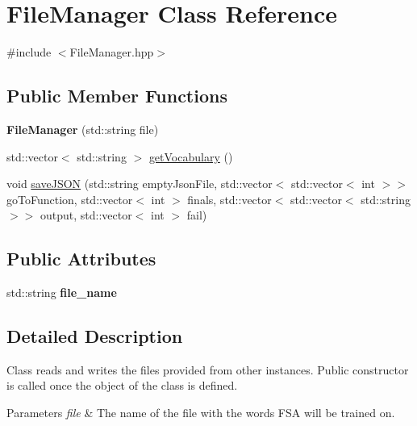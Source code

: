 \hypertarget{classFileManager}{}\section{File\+Manager Class Reference}
\label{classFileManager}


{\ttfamily \#include $<$File\+Manager.\+hpp$>$}

\subsection*{Public Member Functions}
\begin{DoxyCompactItemize}
\item 
\mbox{\label{classFileManager_a5b55a1626f54b1b7c97b8c70d1fe843c}} 
{\bfseries File\+Manager} (std\+::string file)
\item 
std\+::vector$<$ std\+::string $>$ \hyperlink{classFileManager_ac9b807a2698e538246c349023e7b07d1}{get\+Vocabulary} ()
\item 
void \hyperlink{classFileManager_aa3fd9c8bba7be2102df0ddaefa57f65f}{save\+J\+S\+ON} (std\+::string empty\+Json\+File, std\+::vector$<$ std\+::vector$<$ int $>$$>$ go\+To\+Function, std\+::vector$<$ int $>$ finals, std\+::vector$<$ std\+::vector$<$ std\+::string $>$$>$ output, std\+::vector$<$ int $>$ fail)
\end{DoxyCompactItemize}
\subsection*{Public Attributes}
\begin{DoxyCompactItemize}
\item 
\mbox{\label{classFileManager_a75fac6c1f92a1c2ee6fe0d51d7bbcd90}} 
std\+::string {\bfseries file\+\_\+name}
\end{DoxyCompactItemize}


\subsection{Detailed Description}
Class reads and writes the files provided from other instances. Public constructor is called once the object of the class is defined.


\begin{DoxyParams}{Parameters}
{\em file} & The name of the file with the words F\+SA will be trained on. \\
\hline
\end{DoxyParams}


